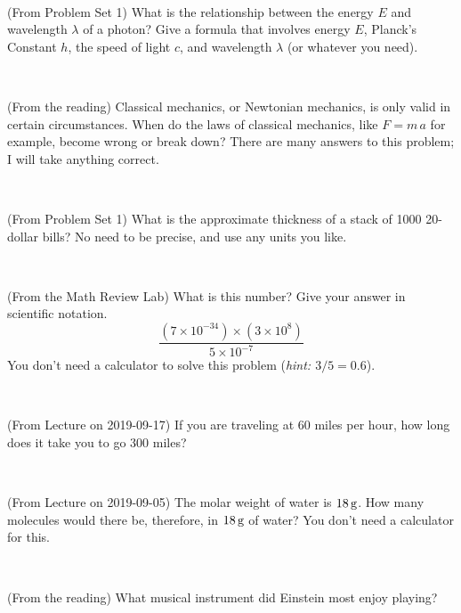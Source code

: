\documentclass[12pt, letterpaper]{article}
\begin{document}
\vfill ~

\begin{problem} (From Problem Set 1)
What is the relationship between the energy $E$ and wavelength
$\lambda$ of a photon? Give a formula that involves energy $E$,
Planck's Constant $h$, the speed of light $c$, and wavelength
$\lambda$ (or whatever you need).
\end{problem}

\vfill ~

\begin{problem} (From the reading)
Classical mechanics, or Newtonian mechanics, is only valid in certain
circumstances. When do the laws of classical mechanics, like $F =
m\,a$ for example, become wrong or break down? There are many answers
to this problem; I will take anything correct.
\end{problem}


\vfill ~

\begin{problem} (From Problem Set 1)
What is the approximate thickness of a stack of 1000 20-dollar bills?
No need to be precise, and use any units you like.
\end{problem}


\vfill ~


\clearpage


\begin{problem} (From the Math Review Lab)
What is this number? Give your answer in scientific notation.
$$
\frac{(7\times10^{-34})\times(3\times10^8)}{5\times10^{-7}}
$$
You don't need a calculator to solve this problem (\textit{hint: $3/5=0.6$}).
\end{problem}


\vfill ~

\begin{problem} (From Lecture on 2019-09-17)
If you are traveling at 60 miles per hour, how long does
it take you to go 300 miles?
\end{problem}


\vfill ~

\begin{problem} (From Lecture on 2019-09-05)
The molar weight of water is $18\,\mathrm{g}$. How many molecules would there
be, therefore, in $18\,\mathrm{g}$ of water? You don't need a calculator for
this.
\end{problem}


\vfill ~

\begin{problem} (From the reading)
What musical instrument did Einstein most enjoy playing?
\end{problem}


\vfill ~


\cleardoublepage
\end{document}
